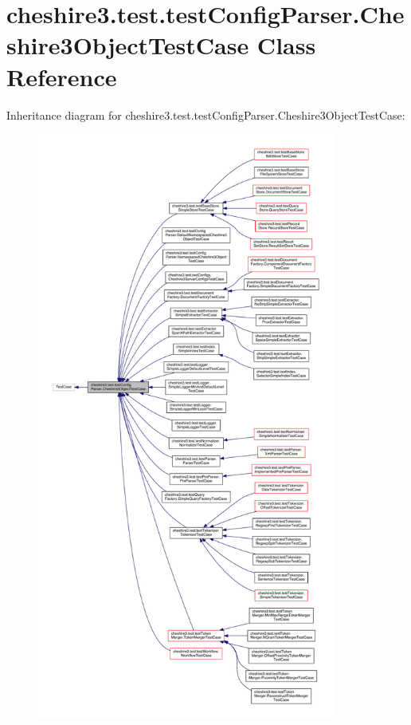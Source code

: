 \hypertarget{classcheshire3_1_1test_1_1test_config_parser_1_1_cheshire3_object_test_case}{\section{cheshire3.\-test.\-test\-Config\-Parser.\-Cheshire3\-Object\-Test\-Case Class Reference}
\label{classcheshire3_1_1test_1_1test_config_parser_1_1_cheshire3_object_test_case}
}


Inheritance diagram for cheshire3.\-test.\-test\-Config\-Parser.\-Cheshire3\-Object\-Test\-Case\-:
\nopagebreak
\begin{figure}[H]
\begin{center}
\leavevmode
\includegraphics[height=550pt]{classcheshire3_1_1test_1_1test_config_parser_1_1_cheshire3_object_test_case__inherit__graph}
\end{center}
\end{figure}


